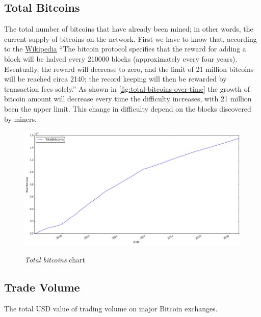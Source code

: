
\subsection{Total Bitcoins}
\label{sec:total-bitcoins}

The total number of bitcoins that have already been mined; in other
words, the current supply of bitcoins on the network. First we have to
know that, according to the \href{}{Wikipedia} ``The bitcoin protocol
specifies that the reward for adding a block will be halved every
210000 blocks (approximately every four years). Eventually, the reward
will decrease to zero, and the limit of 21 million bitcoins will be
reached circa 2140; the record keeping will then be rewarded by
transaction fees solely.'' As shown in
\autoref{fig:total-bitcoins-over-time} the growth of bitcoin amount
will decrease every time the difficulty increases, with 21 million
been the upper limit. This change in difficulty depend on the blocks
discovered by miners.

\begin{figure}[bth]
  \myfloatalign
  {\includegraphics[width=1\linewidth]
    {gfx/total-bitcoins-over-time}}
  \caption{\textit{Total bitcoins} chart}
  \label{fig:total-bitcoins-over-time}
\end{figure}


\subsection{Trade Volume}
\label{sec:trade-volume}

The total USD value of trading volume on major Bitcoin exchanges.

